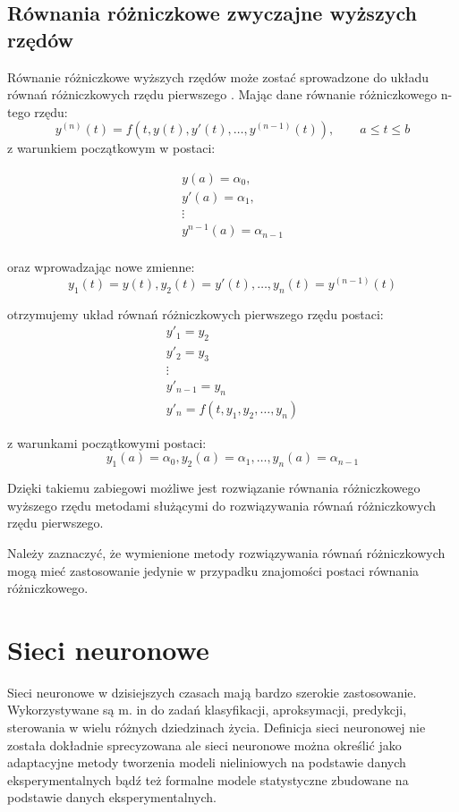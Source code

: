\subsection*{Równania różniczkowe zwyczajne wyższych rzędów}
Równanie różniczkowe wyższych rzędów może zostać sprowadzone do układu równań różniczkowych rzędu pierwszego \cite{AK_RBG2002}. Mając dane równanie różniczkowego n-tego rzędu:
$$y^{(n)}(t) = f(t,y(t),y'(t),\hdots,y^{(n-1)}(t)), \qquad a \leq t \leq b$$
z warunkiem początkowym w postaci:

$$\begin{array}{c}
y(a)       = \alpha_0,    \\
y'(a)      = \alpha_1,    \\
\vdots					  \\
y^{n-1}(a) = \alpha_{n-1} \\
\end{array}$$

oraz wprowadzając nowe zmienne:
$$y_1(t) = y(t), y_2(t) = y'(t), \hdots, y_n(t) = y^{(n-1)}(t)$$

otrzymujemy układ równań różniczkowych pierwszego rzędu postaci:
$$\begin{array}{l}
y'_1       = y_2   \\
y'_2       = y_3   \\
\vdots			   \\
y'_{n-1} = y_n     \\
y'_n = f(t,y_1,y_2,\hdots,y_n)
\end{array}$$

z warunkami początkowymi postaci:
$$y_1(a) = \alpha_0, y_2(a) = \alpha_1, \hdots, y_n(a) = \alpha_{n-1}$$

Dzięki takiemu zabiegowi możliwe jest rozwiązanie równania różniczkowego wyższego rzędu metodami służącymi do rozwiązywania równań różniczkowych rzędu pierwszego.

Należy zaznaczyć, że wymienione metody rozwiązywania równań różniczkowych mogą mieć zastosowanie jedynie w przypadku znajomości postaci równania różniczkowego.
 
\newpage
\section{Sieci neuronowe} 

Sieci neuronowe w dzisiejszych czasach mają bardzo szerokie zastosowanie. Wykorzystywane są m. in do zadań klasyfikacji, aproksymacji, predykcji, sterowania w wielu różnych dziedzinach życia. Definicja sieci neuronowej nie została dokładnie sprecyzowana ale sieci neuronowe można określić jako adaptacyjne metody tworzenia modeli nieliniowych na podstawie danych eksperymentalnych bądź też formalne modele statystyczne zbudowane na podstawie danych eksperymentalnych\cite{Jankowski}.
 
